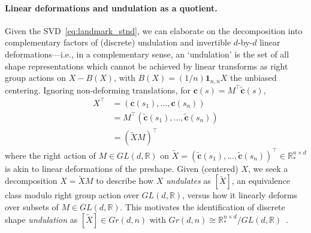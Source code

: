 \documentclass[pdflatex,iicol]{sn-jnl}%
\theoremstyle{thmstyleone}%
\theoremstyle{thmstyletwo}%
\theoremstyle{thmstylethree}%
\begin{document}
\begin{appendices}
\paragraph{Linear deformations and undulation as a quotient.}
Given the SVD~\eqref{eq:landmark_stnd}, we can elaborate on the decomposition into complementary factors of (discrete) undulation and invertible $d$-by-$d$ linear deformations---i.e., in a complementary sense, an `undulation' is the set of all shape representations which cannot be achieved by linear transforms as right group actions on $X - B(X)$, with $B(X) = (1/n)\boldsymbol{1}_{n,n}X$ the unbiased centering. Ignoring non-deforming translations, for $\boldsymbol{c}(s) = M^{\top}\widetilde{\boldsymbol{c}}(s)$,
\begin{align}
    X^{\top} &= (\boldsymbol{c}(s_1),\dots,\boldsymbol{c}(s_n))\\ \nonumber
    &= M^{\top}(\widetilde{\boldsymbol{c}}(s_1),\dots,\widetilde{\boldsymbol{c}}(s_n)) \\ \nonumber
    &= (\widetilde{X}M)^{\top} \nonumber
\end{align}
where the right action of $M \in GL(d,\mathbb{R})$ on $\widetilde{X} = (\widetilde{\boldsymbol{c}}(s_1),\dots,\widetilde{\boldsymbol{c}}(s_n))^{\top}\in \mathbb{R}^{n \times d}_*$ is akin to linear deformations of the preshape. Given (centered) $X$, we seek a decomposition $X = \widetilde{X}M$ to describe how $X$ \textit{undulates} as $[\widetilde{X}]$, an equivalence class modulo right group action over $GL(d,\mathbb{R})$, versus how it linearly deforms over subsets of $M \in GL(d,\mathbb{R})$. This motivates the identification of discrete shape \textit{undulation} as $[\widetilde{X}] \in Gr(d,n)$ with $Gr(d,n) \cong \mathbb{R}^{n \times d}_*/GL(d,\mathbb{R})$~\cite{absil2008optimization}.


\end{appendices}
\end{document}
